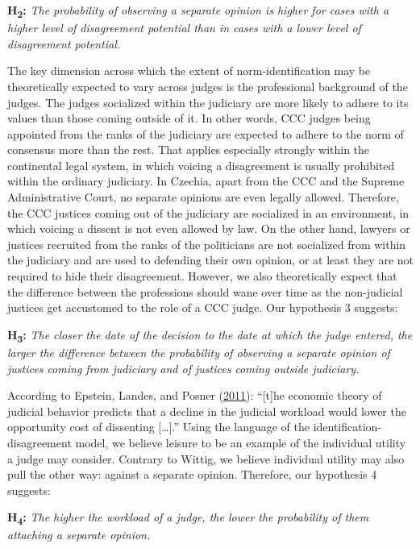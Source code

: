 \documentclass[
  11pt,
]{article}
\begin{document}
\textbf{H\textsubscript{2}:} \emph{The probability of observing a
separate opinion is higher for cases with a higher level of disagreement
potential than in cases with a lower level of disagreement potential.}

The key dimension across which the extent of norm-identification may be
theoretically expected to vary across judges is the professional
background of the judges. The judges socialized within the judiciary are
more likely to adhere to its values than those coming outside of it. In
other words, CCC judges being appointed from the ranks of the judiciary
are expected to adhere to the norm of consensus more than the rest. That
applies especially strongly within the continental legal system, in
which voicing a disagreement is usually prohibited within the ordinary
judiciary. In Czechia, apart from the CCC and the Supreme Administrative
Court, no separate opinions are even legally allowed. Therefore, the CCC
justices coming out of the judiciary are socialized in an environment,
in which voicing a dissent is not even allowed by law. On the other
hand, lawyers or justices recruited from the ranks of the politicians
are not socialized from within the judiciary and are used to defending
their own opinion, or at least they are not required to hide their
disagreement. However, we also theoretically expect that the difference
between the professions should wane over time as the non-judicial
justices get accustomed to the role of a CCC judge. Our hypothesis 3
suggests:

\textbf{H\textsubscript{3}:} \emph{The closer the date of the decision
to the date at which the judge entered, the larger the difference
between the probability of observing a separate opinion of justices
coming from judiciary and of justices coming outside judiciary.}

According to Epstein, Landes, and Posner
(\protect\hyperlink{ref-epsteinWhyWhenJudges2011}{2011}): ``{[}t{]}he
economic theory of judicial behavior predicts that a decline in the
judicial workload would lower the opportunity cost of dissenting
{[}\ldots{]}.'' Using the language of the identification-disagreement
model, we believe leisure to be an example of the individual utility a
judge may consider. Contrary to Wittig, we believe individual utility
may also pull the other way: against a separate opinion. Therefore, our
hypothesis 4 suggests:

\textbf{H\textsubscript{4}:} \emph{The higher the workload of a judge,
the lower the probability of them attaching a separate opinion.}
\end{document}
